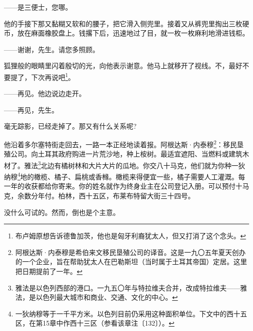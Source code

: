 \par ——是三便士，您哪。
\par 他的手接下那又黏糊又软和的腰子，把它滑入侧兜里。接着又从裤兜里掏出三枚硬币，放在麻面橡胶盘上。钱撂下后，迅速地过了目，就一枚一枚麻利地滑进钱柜。
\par ——谢谢，先生。请您多照顾。
\par 狐狸般的眼睛里闪着殷切的光，向他表示谢意。他马上就移开了视线。不，最好不要提了，下次再说吧\footnote{布卢姆原想告诉德鲁加茨，他也是匈牙利裔犹太人，但又打消了这个念头。}。
\par ——再见。他边说边走开。
\par ——再见，先生。
\par 毫无踪影，已经走掉了。那又有什么关系呢?
\par 他沿着多尔塞特街走回去，一路一本正经地读着报。阿根达斯·内泰穆\footnote{阿根达斯·内泰穆是希伯来文移民垦殖公司的译音。这是一九〇五年夏天创办的一个企业，旨在帮助犹太人在巴勒斯坦（当时属于土耳其帝国）定居。这里把日期提前了一年。}：移民垦殖公司。向土耳其政府购进一片荒沙地，种上桉树。最适宜遮阳、当燃料或建筑木材了。雅法\footnote{雅法是以色列西部的港口。一九五〇年与特拉维夫合并，改成特拉维夫——雅法，是以色列最大城市和商业、交通、文化的中心。}北边有橘树林和大片大片的瓜地。你交八十马克，他们就为你种一狄纳穆\footnote{一狄纳穆等于一千平方米。以色列目前仍采用这种面积单位。下文中的西十五区，在第15章中作西十三区（参看该章注〔132〕）。}地的橄榄、橘子、扁桃或香橼。橄榄来得便宜一些，橘子需要人工灌溉。每一年的收获都给你寄来。你的姓名就作为终身业主在公司登记入册。可以预付十马克，余数分年付。柏林，西十五区，布莱布特留大街三十四号。
\par 没什么可试的。然而，倒也是个主意。
